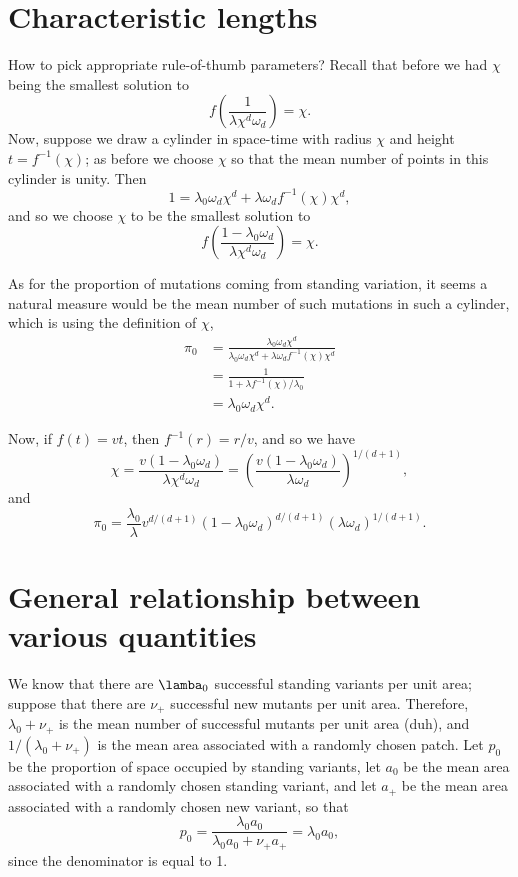 \documentclass{article}
\begin{document}
\section{Characteristic lengths}

How to pick appropriate rule-of-thumb parameters?
Recall that before we had $\chi$ being the smallest solution to
\[
    f\left( \frac{1}{\lambda \chi^d \omega_d} \right) = \chi.
\]
Now, suppose we draw a cylinder in space-time with radius $\chi$ and height $t=f^{-1}(\chi)$;
as before we choose $\chi$ so that the mean number of points in this cylinder is unity.
Then
\[
    1 = \lambda_0 \omega_d \chi^d + \lambda \omega_d f^{-1}(\chi) \chi^d ,
\]
and so we choose $\chi$ to be the smallest solution to
\[
    f\left( \frac{1 - \lambda_0 \omega_d}{\lambda \chi^d \omega_d} \right) = \chi.
\]

As for the proportion of mutations coming from standing variation,
it seems a natural measure would be the mean number of such mutations in such a cylinder,
which is using the definition of $\chi$,
\begin{align*}
    \pi_0 &= \frac{\lambda_0 \omega_d \chi^d }{ \lambda_0 \omega_d \chi^d + \lambda \omega_d f^{-1}(\chi) \chi^d} \\
        & = \frac{ 1 }{ 1 + \lambda f^{-1}(\chi) / \lambda_0 } \\
        &= \lambda_0 \omega_d \chi^d .
\end{align*}

Now, if $f(t) = vt$, then $f^{-1}(r) = r/v$,
and so we have
\[
    \chi = \frac{ v (1-\lambda_0 \omega_d) }{ \lambda \chi^d \omega_d } = \left( \frac{ v(1-\lambda_0 \omega_d) }{ \lambda \omega_d } \right)^{1/(d+1)} ,
\]
and 
\[
    \pi_0 = \frac{\lambda_0}{\lambda} v^{d/(d+1)} (1-\lambda_0 \omega_d)^{d/(d+1)} (\lambda \omega_d)^{1/(d+1)} .
\]


\section{General relationship between various quantities}

We know that there are $\lamba_0$ successful standing variants per unit area;
suppose that there are $\nu_+$ successful new mutants per unit area.
Therefore, $\lambda_0+\nu_+$ is the mean number of successful mutants per unit area (duh),
and $1/(\lambda_0+\nu_+)$ is the mean area associated with a randomly chosen patch.
Let $p_0$ be the proportion of space occupied by standing variants, 
let $a_0$ be the mean area associated with a randomly chosen standing variant,
and let $a_+$ be the mean area associated with a randomly chosen new variant,
so that
\[
    p_0 = \frac{ \lambda_0 a_0 }{ \lambda_0 a_0 + \nu_+ a_+ } = \lambda_0 a_0 ,
\]
since the denominator is equal to 1.
\end{document}
